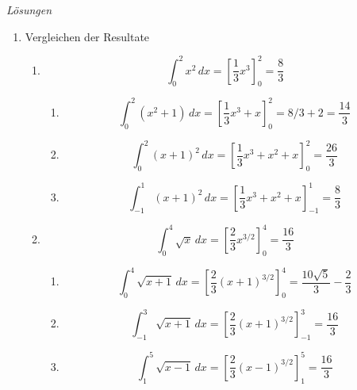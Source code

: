 \clearpage
\emph{Lösungen}

\begin{enumerate}
	\item Vergleichen der Resultate
	      \begin{enumerate}
		      \item
		            \[
			            \int_0^2 x^2 \, dx
			            = \left[\frac{1}{3}x^3\right]_0^2
			            = \frac{8}{3}
		            \]
		            \begin{enumerate}
			            \item
			                  \[
				                  \int_0^2 (x^2+1)\,dx
				                  = \left[\frac{1}{3}x^3+x\right]_0^2
				                  = 8/3 + 2
				                  = \frac{14}{3}
			                  \]
			            \item
			                  \[
				                  \int_0^2 (x+1)^2\,dx
				                  = \left[\frac{1}{3}x^3+x^2+x\right]_0^2
				                  = \frac{26}{3}
			                  \]
			            \item
			                  \[
				                  \int_{-1}^1 (x+1)^2\,dx
				                  = \left[\frac{1}{3}x^3+x^2+x\right]_{-1}^1
				                  = \frac{8}{3}
			                  \]
		            \end{enumerate}

		      \item
		            \[
			            \int_0^4 \sqrt{x}\,dx
			            = \left[\frac{2}{3}x^{3/2}\right]_0^4
			            = \frac{16}{3}
		            \]
		            \begin{enumerate}
			            \item
			                  \[
				                  \int_0^4 \sqrt{x+1}\,dx
				                  = \left[\frac{2}{3}(x+1)^{3/2}\right]_0^4
				                  = \frac{10\sqrt{5}}{3}-\frac{2}{3}
			                  \]
			            \item
			                  \[
				                  \int_{-1}^3 \sqrt{x+1}\,dx
				                  = \left[\frac{2}{3}(x+1)^{3/2}\right]_{-1}^3
				                  = \frac{16}{3}
			                  \]
			            \item
			                  \[
				                  \int_1^5 \sqrt{x-1}\,dx
				                  = \left[\frac{2}{3}(x-1)^{3/2}\right]_1^5
				                  = \frac{16}{3}
			                  \]
		            \end{enumerate}
	      \end{enumerate}


\end{enumerate}
